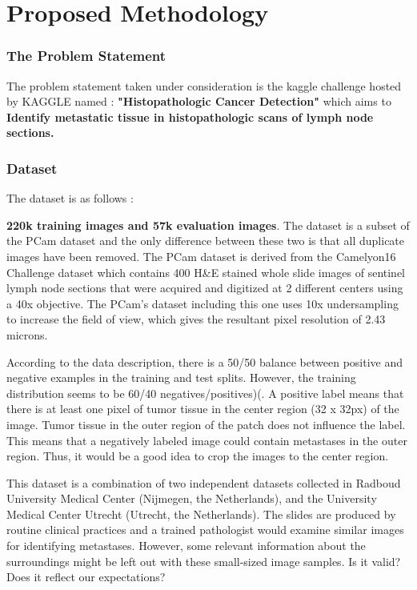 \documentclass[19pt]{article}
\begin{document}
\newpage
\section{Proposed Methodology}

\subsubsection{The Problem Statement}
The problem statement taken under consideration is the kaggle challenge hosted by KAGGLE named : \textbf{"Histopathologic Cancer Detection"} which aims to \textbf{ Identify metastatic tissue in histopathologic scans of lymph node sections.} 
\subsubsection{Dataset}

The dataset is as follows :

\textbf{220k training images and 57k evaluation images}. The dataset is a subset of the PCam dataset and the only difference between these two is that all duplicate images have been removed. The PCam dataset is derived from the Camelyon16 Challenge dataset which contains 400 H\&E stained whole slide images of sentinel lymph node sections that were acquired and digitized at 2 different centers using a 40x objective. The PCam's dataset including this one uses 10x undersampling to increase the field of view, which gives the resultant pixel resolution of 2.43 microns.

According to the data description, there is a 50/50 balance between positive and negative examples in the training and test splits. However, the training distribution seems to be 60/40 negatives/positives)(. A positive label means that there is at least one pixel of tumor tissue in the center region (32 x 32px) of the image. Tumor tissue in the outer region of the patch does not influence the label. This means that a negatively labeled image could contain metastases in the outer region. Thus, it would be a good idea to crop the images to the center region.


This dataset is a combination of two independent datasets collected in Radboud University Medical Center (Nijmegen, the Netherlands), and the University Medical Center Utrecht (Utrecht, the Netherlands). The slides are produced by routine clinical practices and a trained pathologist would examine similar images for identifying metastases. However, some relevant information about the surroundings might be left out with these small-sized image samples.
Is it valid? Does it reflect our expectations?
\end{document}
